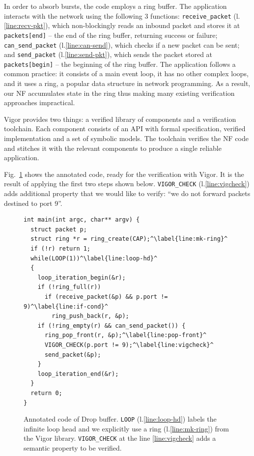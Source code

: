 \documentclass[letterpaper,twocolumn,10pt]{article}
\newcommand{\code}[1]{\lstinline{#1}}
\begin{document}
In order to absorb bursts, the code employs a ring buffer. The application
interacts with the network using the following 3 functions:
\code{receive_packet} (l.\ref{line:recv-pkt}), which non-blockingly reads an
inbound packet and stores it at \code{packets[end]} -- the end of the ring
buffer, returning success or failure; \code{can_send_packet}
(l.\ref{line:can-send}), which checks if a new packet can be sent; and
\code{send_packet} (l.\ref{line:send-pkt}), which sends the packet stored at
\code{packets[begin]} -- the beginning of the ring buffer. The application
follows a common practice: it consists of a main event loop, it has no other
complex loops, and it uses a ring, a popular data structure in network
programming. As a result, our NF accumulates state in the ring thus making many
existing verification approaches impractical.

Vigor provides two things: a verified library of components and a verification
toolchain. Each component consists of an API with formal specification, verified
implementation and a set of symbolic models. The toolchain verifies the NF code
and stitches it with the relevant components to produce a single reliable
application.

Fig.~\ref{lst:vigor} shows the annotated code, ready for the verification with
Vigor. It is the result of applying the first two steps shown below.
\code{VIGOR_CHECK} (l.\ref{line:vigcheck}) adds additional property that we
would like to verify: ``we do not forward packets destined to port 9''.

\begin{figure}[h!]
\begin{lstlisting}
int main(int argc, char** argv) {
  struct packet p;
  struct ring *r = ring_create(CAP);^\label{line:mk-ring}^
  if (!r) return 1;
  while(LOOP(1))^\label{line:loop-hd}^
  {
    loop_iteration_begin(&r);
    if (!ring_full(r))
      if (receive_packet(&p) && p.port != 9)^\label{line:if-cond}^
        ring_push_back(r, &p);
    if (!ring_empty(r) && can_send_packet()) {
      ring_pop_front(r, &p);^\label{line:pop-front}^
      VIGOR_CHECK(p.port != 9);^\label{line:vigcheck}^
      send_packet(&p);
    }
    loop_iteration_end(&r);
  }
  return 0;
}
\end{lstlisting}
  \caption{Annotated code of Drop buffer.
    \code{LOOP} (l.\ref{line:loop-hd}) labels the infinite loop head and we
    explicitly use a ring (l.\ref{line:mk-ring}) from the Vigor library. \code{VIGOR_CHECK} at the
    line \ref{line:vigcheck} adds a semantic property to be verified.}
  \label{lst:vigor}
\end{figure}
\end{document}
